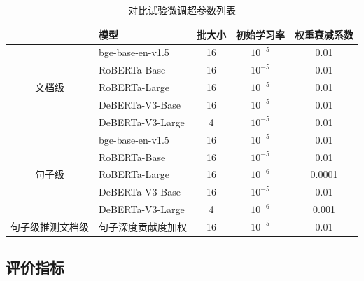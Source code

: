 \begin{table}[htbp]
\centering
\caption{对比试验微调超参数列表}
\label{tab:hyper-parameters}
\begin{tabular}{c|l|ccc}
\toprule
                          & \textbf{模型}   & \textbf{批大小} & \textbf{初始学习率} & \textbf{权重衰减系数} \\ \midrule
\multirow{5}{*}{文档级}   & bge-base-en-v1.5 \cite{bge_embedding} & 16                  & $10^{-5}$                & 0.01                  \\
                          & RoBERTa-Base \cite{liu_roberta_2019}     & 16                  & $10^{-5}$                & 0.01                  \\
                          & RoBERTa-Large \cite{liu_roberta_2019}    & 16                  & $10^{-5}$                & 0.01                  \\
                          & DeBERTa-V3-Base \cite{he2023debertav3improvingdebertausing}  & 16                  & $10^{-5}$                & 0.01                  \\
                          & DeBERTa-V3-Large \cite{he2023debertav3improvingdebertausing} & 4                   & $10^{-5}$                & 0.01                  \\ \midrule
\multirow{5}{*}{句子级}   & bge-base-en-v1.5 \cite{bge_embedding} & 16                  & $10^{-5}$                & 0.01                  \\
                          & RoBERTa-Base \cite{liu_roberta_2019}     & 16                  & $10^{-5}$                & 0.01                  \\
                          & RoBERTa-Large \cite{liu_roberta_2019}    & 16                  & $10^{-6}$               & 0.0001                \\
                          & DeBERTa-V3-Base \cite{he2023debertav3improvingdebertausing}  & 16                  & $10^{-5}$                & 0.01                  \\
                          & DeBERTa-V3-Large \cite{he2023debertav3improvingdebertausing} & 4                   & $10^{-6}$               & 0.001                 \\ \midrule
句子级推测文档级 & 句子深度贡献度加权 & 16 & $10^{-5}$ & 0.01 \\ \bottomrule
\end{tabular}
\end{table}

\subsection{评价指标}
\label{sec:method-experiment-metric}


